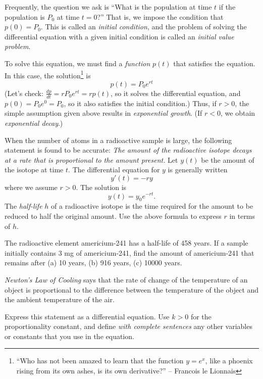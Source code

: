 Frequently, the question we ask is ``What is the population at time $t$
if the population is $P_0$ at time $t=0$?''  That is, we impose the
condition that $p(0)=P_0$.  This is called an
\emph{initial condition}, and the problem of solving the differential
equation with a given initial condition is called an
\emph{initial value problem}.

To solve this equation, we must find a \emph{function} $p(t)$
that satisfies the equation.  In this case, the solution\footnote{%
``Who has not been amazed to learn that the function $y = e^x$, like a 
      phoenix rising from its own ashes, is its own derivative?'' 
       -- Francois le Lionnais
}
is
\begin{equation}
  p(t) = P_0 e^{rt}
\end{equation}
(Let's check:  $\frac{dp}{dt} = rP_0e^{rt} = r p(t)$, so  it solves the differential
equation, and $p(0) = P_0e^0 = P_0$, so it also satisfies the initial condition.)
Thus, if $r > 0$, the simple assumption given above results in
\emph{exponential growth}.
(If $r < 0$, we obtain \emph{exponential decay}.)

\newpage

\begin{exercises}
\begin{exercise}
\label{ex:UnconstrPopGrowth_halflife_formula}
When the number of atoms in a radioactive sample is large,
the following statement is found to be accurate:
\emph{The amount of the radioactive isotope decays at 
a rate that is proportional to the amount present.}
Let $y(t)$ be the amount of the isotope at time $t$.
The differential equation for $y$ is generally written
\[
   y'(t) = -ry
\]
where we assume $r > 0$.  The solution is
\[
   y(t) = y_0 e^{-rt}.
\]
The \emph{half-life} $h$ of a radioactive
isotope is the time required for the amount to be reduced
to half the original amount.
Use the above formula to express $r$ in terms of $h$.
\end{exercise}
\begin{exercise}
\label{ex:UnconstrPopGrowth_americium}
The radioactive element americium-241 has a half-life
of 458 years.
If a sample initially contains 3 mg of americium-241,
find the amount of americium-241 that remains
after (a) 10 years, (b) 916 years, (c) 10000 years.
\end{exercise}
\begin{exercise}
\label{ex:NewtonsLawOfCooling}
\emph{Newton's Law of Cooling}
says that the rate of change
of the temperature of an object is proportional
to the difference between the temperature of the object
and the ambient temperature of the air.

Express this statement as a differential equation.
Use $k>0$ for the proportionality constant, and define
\emph{with complete sentences}
any other variables or constants that you use in the equation.

\end{exercise}
\end{exercises}

